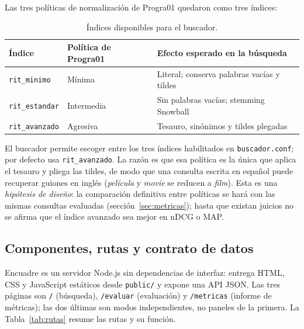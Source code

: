 \documentclass[11pt,spanish]{article}
\begin{document}
Las tres políticas de normalización de Progra01 quedaron como tres índices:
\begin{table}[htbp]
  \centering
  \footnotesize
  \caption{Índices disponibles para el buscador.}
  \label{tab:indices}
  \begin{tabular*}{\linewidth}{@{\extracolsep{\fill}}lll@{}}
    \toprule
    \textbf{Índice} & \textbf{Política de Progra01} & \textbf{Efecto esperado en la búsqueda} \\
    \midrule
    \texttt{rit\_minimo} & Mínima & Literal; conserva palabras vacías y tildes \\
    \texttt{rit\_estandar} & Intermedia & Sin palabras vacías; stemming Snowball \\
    \texttt{rit\_avanzado} & Agresiva & Tesauro, sinónimos y tildes plegadas \\
    \bottomrule
  \end{tabular*}
\end{table}

El buscador permite escoger entre los tres índices habilitados en
\texttt{buscador.conf}; por defecto usa \texttt{rit\_avanzado}. La razón es que
esa política es la única que aplica el tesauro y pliega las tildes, de modo que
una consulta escrita en español puede recuperar guiones en inglés
(\textit{película} y \textit{movie} se reducen a \textit{film}). Esta es una
\emph{hipótesis de diseño}: la comparación definitiva entre políticas se hará
con las mismas consultas evaluadas (sección~\ref{sec:metricas}); hasta que
existan juicios no se afirma que el índice avanzado sea mejor en nDCG o MAP.

\subsection{Componentes, rutas y contrato de datos}
\label{sec:rutas}

Encuadre es un servidor Node.js sin dependencias de interfaz: entrega HTML,
CSS y JavaScript estáticos desde \texttt{public/} y expone una API JSON. Las
tres páginas son \texttt{/} (búsqueda), \texttt{/evaluar} (evaluación) y
\texttt{/metricas} (informe de métricas); las dos últimas son modos
independientes, no paneles de la primera. La Tabla~\ref{tab:rutas} resume las
rutas y su función.
\end{document}
